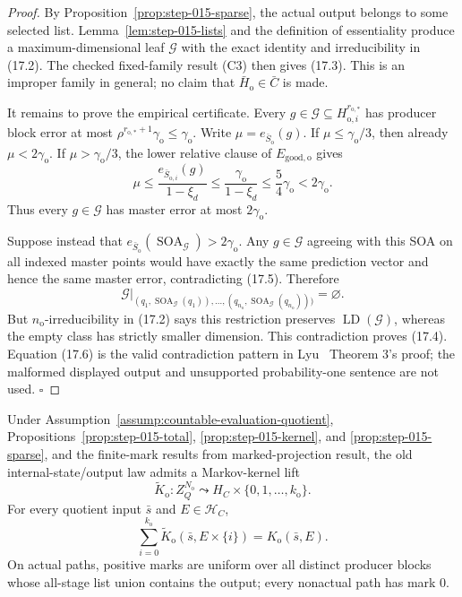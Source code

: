 \begin{proof}
By Proposition~\ref{prop:step-015-sparse}, the actual output belongs to
some selected list. Lemma~\ref{lem:step-015-lists} and the definition of
essentiality produce a maximum-dimensional leaf \(\mathcal G\) with the
exact identity and irreducibility in (17.2). The checked fixed-family
result (C3) then gives (17.3). This is an improper family in general; no
claim that \(\bar H_{\mathrm o}\in\bar C\) is made.

It remains to prove the empirical certificate. Every
\(g\in\mathcal G\subseteq H_{\mathrm o,i}^{r_{\mathrm o,*}}\) has producer
block error at most
\(\rho^{r_{\mathrm o,*}+1}\gamma_{\mathrm o}\le\gamma_{\mathrm o}\).
Write \(\mu=e_{\bar S_{\mathrm o}}(g)\). If
\(\mu\le\gamma_{\mathrm o}/3\), then already \(\mu<2\gamma_{\mathrm o}\).
If \(\mu>\gamma_{\mathrm o}/3\), the lower relative clause of
\(E_{\mathrm{good,o}}\) gives
\[
\mu\le\frac{e_{\bar S_{\mathrm o,i}}(g)}{1-\xi_d}
\le\frac{\gamma_{\mathrm o}}{1-\xi_d}
\le\frac54\gamma_{\mathrm o}<2\gamma_{\mathrm o}.
\tag{17.5}
\]
Thus every \(g\in\mathcal G\) has master error at most
\(2\gamma_{\mathrm o}\).

Suppose instead that
\(e_{\bar S_{\mathrm o}}(\operatorname{SOA}_{\mathcal G})
>2\gamma_{\mathrm o}\). Any \(g\in\mathcal G\) agreeing with this SOA on
all indexed master points would have exactly the same prediction vector
and hence the same master error, contradicting (17.5). Therefore
\[
\mathcal G|_{(q_1,\operatorname{SOA}_{\mathcal G}(q_1)),\ldots,
(q_{n_{\mathrm o}},
\operatorname{SOA}_{\mathcal G}(q_{n_{\mathrm o}})))}
=\varnothing.
\tag{17.6}
\]
But \(n_{\mathrm o}\)-irreducibility in (17.2) says this restriction
preserves \(\operatorname{LD}(\mathcal G)\), whereas the empty class has
strictly smaller dimension. This contradiction proves (17.4). Equation
(17.6) is the valid contradiction pattern in Lyu~\citep{lyu2025} Theorem 3's proof; the
malformed displayed output and unsupported probability-one sentence are
not used. \(\square\)


\end{proof}

\begin{proposition}\label{prop:step-015-mark}
Under Assumption~\ref{assump:countable-evaluation-quotient},
Propositions~\ref{prop:step-015-total},
\ref{prop:step-015-kernel}, and
\ref{prop:step-015-sparse}, and the  finite-mark results from
marked-projection result, the old internal-state/output law admits a Markov-kernel lift
\[
\widetilde K_{\mathrm o}:
Z_Q^{N_{\mathrm o}}\leadsto
H_C\times\{0,1,\ldots,k_{\mathrm o}\}.
\tag{18.1}
\]
For every quotient input \(\bar s\) and \(E\in\mathcal H_C\),
\[
\sum_{i=0}^{k_{\mathrm o}}
\widetilde K_{\mathrm o}(\bar s,E\times\{i\})
=K_{\mathrm o}(\bar s,E).
\tag{18.2}
\]
On actual paths, positive marks are uniform over all distinct producer
blocks whose all-stage list union contains the output; every nonactual
path has mark \(0\).


\end{proposition}


